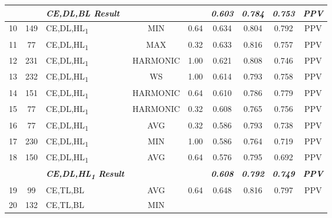 \begin{table}[H]
{\begin{tabular}{cc|l|cc|c|c|c|c|}
   &
     &
    \textit{\textbf{CE,DL,BL Result}} &
     &
     &
    \textit{\textbf{0.603}} &
    \textit{\textbf{0.784}} &
    \textit{\textbf{0.753}} &
    \textit{\textbf{PPV}} \\ \hline
  \multicolumn{1}{|c|}{10} &
    149 &
    CE,DL,HL\textsubscript{1} &
    \multicolumn{1}{c|}{MIN} &
    0.64 &
    0.634 &
    0.804 &
    0.792 &
    PPV \\ \hline
  \multicolumn{1}{|c|}{11} &
    77 &
    CE,DL,HL\textsubscript{1} &
    \multicolumn{1}{c|}{MAX} &
    0.32 &
    0.633 &
    0.816 &
    0.757 &
    PPV \\ \hline
  \multicolumn{1}{|c|}{12} &
    231 &
    CE,DL,HL\textsubscript{1} &
    \multicolumn{1}{c|}{HARMONIC} &
    1.00 &
    0.621 &
    0.808 &
    0.746 &
    PPV \\ \hline
  \multicolumn{1}{|c|}{13} &
    232 &
    CE,DL,HL\textsubscript{1} &
    \multicolumn{1}{c|}{WS} &
    1.00 &
    0.614 &
    0.793 &
    0.758 &
    PPV \\ \hline
  \multicolumn{1}{|c|}{14} &
    151 &
    CE,DL,HL\textsubscript{1} &
    \multicolumn{1}{c|}{HARMONIC} &
    0.64 &
    0.610 &
    0.786 &
    0.779 &
    PPV \\ \hline
  \multicolumn{1}{|c|}{15} &
    77 &
    CE,DL,HL\textsubscript{1} &
    \multicolumn{1}{c|}{HARMONIC} &
    0.32 &
    0.608 &
    0.765 &
    0.756 &
    PPV \\ \hline
  \multicolumn{1}{|c|}{16} &
    77 &
    CE,DL,HL\textsubscript{1} &
    \multicolumn{1}{c|}{AVG} &
    0.32 &
    0.586 &
    0.793 &
    0.738 &
    PPV \\ \hline
  \multicolumn{1}{|c|}{17} &
    230 &
    CE,DL,HL\textsubscript{1} &
    \multicolumn{1}{c|}{MIN} &
    1.00 &
    0.586 &
    0.764 &
    0.719 &
    PPV \\ \hline
  \multicolumn{1}{|c|}{18} &
    150 &
    CE,DL,HL\textsubscript{1} &
    \multicolumn{1}{c|}{AVG} &
    0.64 &
    0.576 &
    0.795 &
    0.692 &
    PPV \\ \hline
   &
     &
    \textit{\textbf{CE,DL,HL\textsubscript{1} Result}} &
     &
     &
    \textit{\textbf{0.608}} &
    \textit{\textbf{0.792}} &
    \textit{\textbf{0.749}} &
    \textit{\textbf{PPV}} \\ \hline
  \multicolumn{1}{|c|}{19} &
    99 &
    CE,TL,BL &
    \multicolumn{1}{c|}{AVG} &
    0.64 &
    0.648 &
    0.816 &
    0.797 &
    PPV \\ \hline
  \multicolumn{1}{|c|}{20} &
    132 &
    CE,TL,BL &
    \multicolumn{1}{c|}{MIN} &

\end{tabular}}
\end{table}

